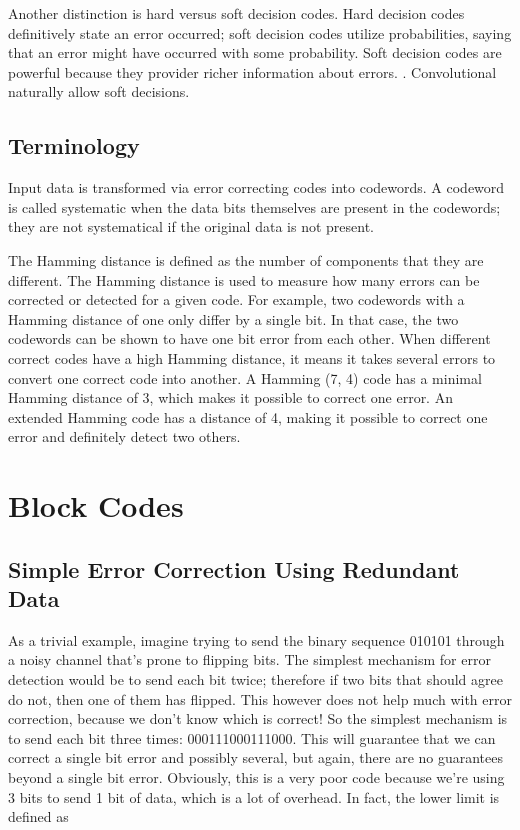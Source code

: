 \documentclass[12pt]{article}
\begin{document}
Another distinction is hard versus soft decision codes. Hard decision codes definitively state an error occurred; soft decision codes utilize probabilities, saying that an error might have occurred with some probability. Soft decision codes are powerful because they provider richer information about errors. \cite{tanenbaum}. Convolutional naturally allow soft decisions. \cite{mitvit}

\subsection{Terminology}

Input data is transformed via error correcting codes into codewords. A codeword is called systematic when the data bits themselves are present in the codewords; they are not systematical if the original data is not present. 

The Hamming distance is defined as the number of components that they are different. The Hamming distance is used to measure how many errors can be corrected or detected for a given code. For example, two codewords with a Hamming distance of one only differ by a single bit. In that case, the two codewords can be shown to have one bit error from each other. When different correct codes have a high Hamming distance, it means it takes several errors to convert one correct code into another. A Hamming (7, 4) code has a minimal Hamming distance of 3, which makes it possible to correct one error. An extended Hamming code has a distance of 4, making it possible to correct one error and definitely detect two others. \cite{sphere}

\section{Block Codes}

\subsection{Simple Error Correction Using Redundant Data}

As a trivial example, imagine trying to send the binary sequence 010101 through a noisy channel that's prone to flipping bits. The simplest mechanism for error detection would be to send each bit twice; therefore if two bits that should agree do not, then one of them has flipped. This however does not help much with error correction, because we don't know which is correct! So the simplest mechanism is to send each bit three times: 000111000111000. This will guarantee that we can correct a single bit error and possibly several, but again, there are no guarantees beyond a single bit error. Obviously, this is a very poor code because we're using 3 bits to send 1 bit of data, which is a lot of overhead. In fact, the lower limit is defined as 
\end{document}
